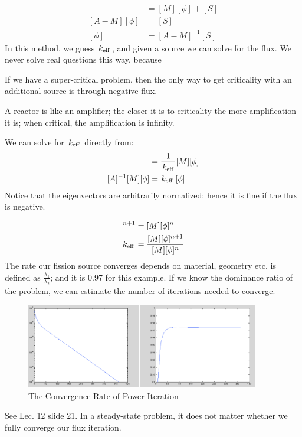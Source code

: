 \documentclass{school-22.211-notes}
\begin{document}
\begin{align}
[A] [\phi] &= [M] [\phi] + [S] \\
[A - M ] [\phi] &= [S] \\
[\phi] &= [A - M]^{-1} [S]
\end{align}
In this method, we guess $\left. k_{\mathrm{eff}} \right.$, and given a source we can solve for the flux. We never solve real questions this way, because 

If we have a super-critical problem, then the only way to get criticality with an additional source is through negative flux. 

A reactor is like an amplifier; the closer it is to criticality the more amplification it is; when critical, the amplification is infinity. 


We can solve for $\left. k_{\mathrm{eff}} \right.$ directly from: 
\begin{align}
[A] [\phi] &= \frac{1}{\keff} [M] [\phi] \\
[A]^{-1} [M] [\phi] &= \keff [\phi]
\end{align}
Notice that the eigenvectors are arbitrarily normalized; hence it is fine if the flux is negative. 


\begin{align}
[A] [\phi]^{n+1} &= [M] [\phi]^n \\
\keff &= \frac{[M][\phi]^{n+1} }{[M] [\phi]^n} 
\end{align}
The rate our fission source converges depends on material, geometry etc.  is defined as $\frac{\lambda_1}{\lambda_2}$; and it is 0.97 for this example. If we know the dominance ratio of the problem, we can estimate the number of iterations needed to converge. 
\begin{figure}
  \centering
  \includegraphics[width=4in]{images/dfs/power-iteration-convergence.png}
  \caption{The Convergence Rate of Power Iteration}
\end{figure}

See Lec. 12 slide 21. In a steady-state problem, it does not matter whether we fully converge our flux iteration. 
\end{document}

